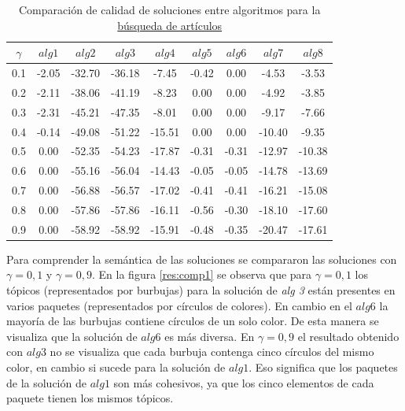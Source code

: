 \begin{table}[H]
\begin{center}
\begin{tabular}{|c|c|c|c|c|c|c|c|c|}
\hline
$\gamma$&$alg1$&$alg2$&$alg3$&$alg4$&$alg5$&$alg6$&$alg7$&$alg8$ \\ \hline
0.1 & -2.05 & -32.70 & -36.18 & -7.45 & -0.42 & 0.00 & -4.53 & -3.53 \\
0.2 & -2.11 & -38.06 & -41.19 & -8.23 & 0.00 & 0.00 & -4.92 & -3.85 \\
0.3 & -2.31 & -45.21 & -47.35 & -8.01 & 0.00 & 0.00 & -9.17 & -7.66 \\
0.4 & -0.14 & -49.08 & -51.22 & -15.51 & 0.00 & 0.00 & -10.40 & -9.35 \\
0.5 & 0.00 & -52.35 & -54.23 & -17.87 & -0.31 & -0.31 & -12.97 & -10.38 \\
0.6 & 0.00 & -55.16 & -56.04 & -14.43 & -0.05 & -0.05 & -14.78 & -13.69 \\
0.7 & 0.00 & -56.88 & -56.57 & -17.02 & -0.41 & -0.41 & -16.21 & -15.08 \\
0.8 & 0.00 & -57.86 & -57.86 & -16.11 & -0.56 & -0.30 & -18.10 & -17.60 \\
0.9 & 0.00 & -58.92 & -58.92 & -15.91 & -0.48 & -0.35 & -20.47 & -17.61 \\ \hline 
\end{tabular}
\caption{Comparación de calidad de soluciones entre algoritmos para la \hyperref[busqueda:articulos]{búsqueda de artículos}} 
\label{tabla:comp1}
\end{center}
\end{table}

Para comprender la semántica de las soluciones se compararon las soluciones con $\gamma = 0,1$ y $\gamma = 0,9$. En la figura \ref{res:comp1} se observa que para $\gamma = 0,1$ los tópicos (representados por burbujas) para la solución de \textit{alg 3} están presentes en varios paquetes (representados por círculos de colores). En cambio en el $alg6$ la mayoría de las burbujas contiene círculos de un solo color. De esta manera se visualiza que la solución de $alg6$ es más diversa. En $\gamma = 0,9$ el resultado obtenido con $alg3$ no se visualiza que cada burbuja contenga cinco círculos del mismo color, en cambio si sucede para la solución de $alg1$. Eso significa que los paquetes de la solución de $alg1$ son más cohesivos, ya que los cinco elementos de cada paquete tienen los mismos tópicos.

